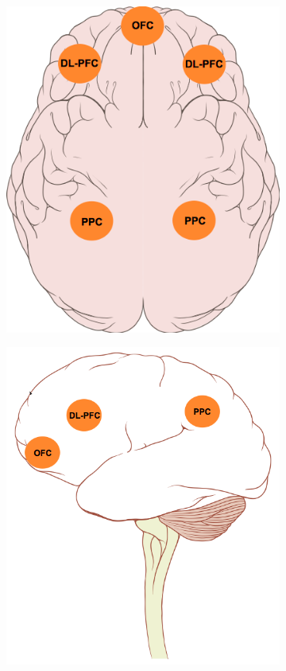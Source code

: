 \documentclass[a4paper, amsfonts, amssymb, amsmath, reprint, showkeys, nofootinbib, twoside]{revtex4-1}
\begin{document}
\begin{figure}[h!]
  \centering
  \begin{subfigure}[b]{0.48\linewidth}
    \includegraphics[width=\linewidth]{images/top-cen.png}
  \end{subfigure}
  \begin{subfigure}[b]{0.48\linewidth}
    \includegraphics[width=\linewidth]{images/side-cen.png}

\end{subfigure}
\end{figure}
\end{document}
